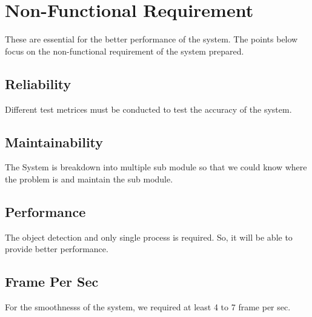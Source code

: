         \section{Non-Functional Requirement}
            These are essential for the better performance of the system. The points below focus on the non-functional requirement of the system prepared. 
            \subsection{Reliability }
                Different test metrices must be conducted to test the accuracy of the system.
            \subsection{Maintainability} 
                The System is breakdown into multiple sub module so that we could know where the problem is and maintain the sub module. 
            \subsection{Performance}
                The object detection and only single process is required. So, it will be able to provide better performance.
            \subsection{Frame Per Sec}
                For the smoothnesss of the system, we required at least 4 to 7 frame per sec. 